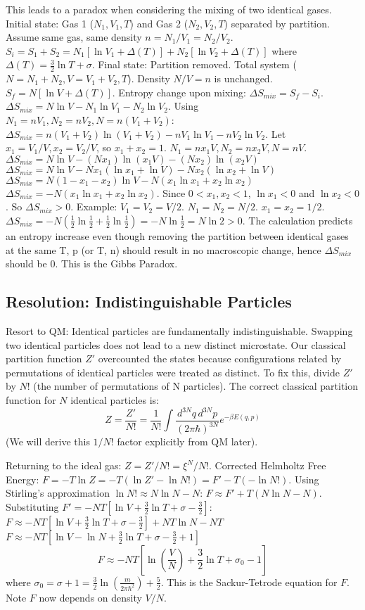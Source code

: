 \documentclass[11pt]{article}
\begin{document}
This leads to a paradox when considering the mixing of two identical gases.
Initial state: Gas 1 ($N_1, V_1, T$) and Gas 2 ($N_2, V_2, T$) separated by partition. Assume same gas, same density $n=N_1/V_1 = N_2/V_2$.
$S_i = S_1 + S_2 = N_1[\ln V_1 + \Delta(T)] + N_2[\ln V_2 + \Delta(T)]$ where $\Delta(T) = \frac{3}{2}\ln T + \sigma$.
Final state: Partition removed. Total system ($N=N_1+N_2, V=V_1+V_2, T$). Density $N/V=n$ is unchanged.
$S_f = N[\ln V + \Delta(T)]$.
Entropy change upon mixing: $\Delta S_{mix} = S_f - S_i$.
$\Delta S_{mix} = N \ln V - N_1 \ln V_1 - N_2 \ln V_2$.
Using $N_1=nV_1, N_2=nV_2, N=n(V_1+V_2)$:
$\Delta S_{mix} = n(V_1+V_2) \ln(V_1+V_2) - nV_1 \ln V_1 - nV_2 \ln V_2$.
Let $x_1=V_1/V, x_2=V_2/V$, so $x_1+x_2=1$. $N_1=n x_1 V, N_2=n x_2 V, N=nV$.
$\Delta S_{mix} = N \ln V - (N x_1) \ln(x_1 V) - (N x_2) \ln(x_2 V)$
$\Delta S_{mix} = N \ln V - N x_1 (\ln x_1 + \ln V) - N x_2 (\ln x_2 + \ln V)$
$\Delta S_{mix} = N (1 - x_1 - x_2) \ln V - N (x_1 \ln x_1 + x_2 \ln x_2)$
$\Delta S_{mix} = -N (x_1 \ln x_1 + x_2 \ln x_2)$.
Since $0 < x_1, x_2 < 1$, $\ln x_1 < 0$ and $\ln x_2 < 0$. So $\Delta S_{mix} > 0$.
Example: $V_1=V_2=V/2$. $N_1=N_2=N/2$. $x_1=x_2=1/2$.
$\Delta S_{mix} = -N (\frac{1}{2}\ln\frac{1}{2} + \frac{1}{2}\ln\frac{1}{2}) = -N \ln\frac{1}{2} = N \ln 2 > 0$.
The calculation predicts an entropy increase even though removing the partition between identical gases at the same T, p (or T, n) should result in no macroscopic change, hence $\Delta S_{mix}$ should be 0. This is the Gibbs Paradox.

\subsection*{Resolution: Indistinguishable Particles}

Resort to QM: Identical particles are fundamentally indistinguishable. Swapping two identical particles does not lead to a new distinct microstate.
Our classical partition function $Z'$ overcounted the states because configurations related by permutations of identical particles were treated as distinct.
To fix this, divide $Z'$ by $N!$ (the number of permutations of N particles).
The correct classical partition function for $N$ identical particles is:
\[ Z = \frac{Z'}{N!} = \frac{1}{N!} \int \frac{d^{3N}q \, d^{3N}p}{(2\pi\hbar)^{3N}} e^{-\beta E(q,p)} \]
(We will derive this $1/N!$ factor explicitly from QM later).

Returning to the ideal gas: $Z = Z'/N! = \xi^N / N!$.
Corrected Helmholtz Free Energy: $F = -T \ln Z = -T (\ln Z' - \ln N!) = F' - T(-\ln N!)$.
Using Stirling's approximation $\ln N! \approx N \ln N - N$:
$F \approx F' + T (N \ln N - N)$.
Substituting $F' = -NT[\ln V + \frac{3}{2}\ln T + \sigma - \frac{3}{2}]$:
$F \approx -NT[\ln V + \frac{3}{2}\ln T + \sigma - \frac{3}{2}] + NT \ln N - NT$
$F \approx -NT[\ln V - \ln N + \frac{3}{2}\ln T + \sigma - \frac{3}{2} + 1]$
\[ F \approx -NT \left[ \ln\left(\frac{V}{N}\right) + \frac{3}{2}\ln T + \sigma_0 - 1 \right] \]
where $\sigma_0 = \sigma + 1 = \frac{3}{2} \ln(\frac{m}{2\pi\hbar^2}) + \frac{5}{2}$.
This is the Sackur-Tetrode equation for $F$. Note $F$ now depends on density $V/N$.
\end{document}
